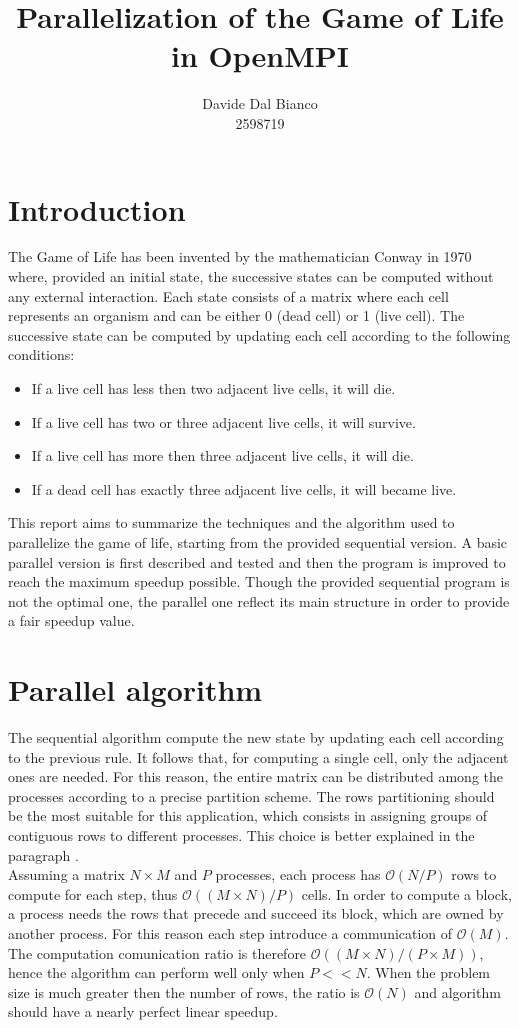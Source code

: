 \documentclass{article}
\title{Parallelization of the Game of Life in OpenMPI}
\author{Davide Dal Bianco \\ 2598719}
\begin{document}
\maketitle

\section{Introduction}
The Game of Life has been invented by the mathematician Conway in 1970 where, provided an initial state, the successive states can be computed without any external interaction. Each state consists of a matrix where each cell represents an organism and can be either 0 (dead cell) or 1 (live cell). The successive state can be computed by updating each cell according to the following conditions:
\begin{itemize}
    \item If a live cell has less then two adjacent live cells, it will die.
    \item If a live cell has two or three adjacent live cells, it will survive.
    \item If a live cell has more then three adjacent live cells, it will die.
    \item If a dead cell has exactly three adjacent live cells, it will became live.
\end{itemize}
This report aims to summarize the techniques and the algorithm used to parallelize the game of life, starting from the provided sequential version. A basic parallel version is first described and tested and then the program is improved to reach the maximum speedup possible. Though the provided sequential program is not the optimal one, the parallel one reflect its main structure in order to provide a fair speedup value.

\section{Parallel algorithm} \label{sec:parallelalgorithm}
The sequential algorithm compute the new state by updating each cell according to the previous rule. It follows that, for computing a single cell, only the adjacent ones are needed. For this reason, the entire matrix can be distributed among the processes according to a precise partition scheme. The rows partitioning should be the most suitable for this application, which consists in assigning groups of contiguous rows to different processes. This choice is better explained in the paragraph . \\
Assuming a matrix $N \times M$ and $P$ processes, each process has $\mathcal{O}(N / P)$ rows to compute for each step, thus $\mathcal{O}((M \times N) / P)$ cells. In order to compute a block, a process needs the rows that precede and succeed its block, which are owned by another process. For this reason each step introduce a communication of $\mathcal{O}(M)$. The computation comunication ratio is therefore $\mathcal{O}((M \times N) / (P \times M))$, hence the algorithm can perform well only when $P << N$. When the problem size is much greater then the number of rows, the ratio is $\mathcal{O}(N)$ and algorithm should have a nearly perfect linear speedup.
\end{document}
